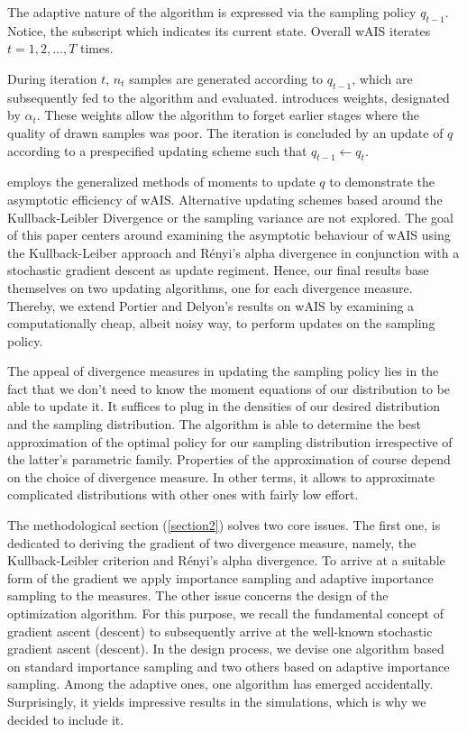 \begin{multicols}{2}
 The adaptive nature of the algorithm is expressed via the sampling policy $q_{t-1}$. Notice, the subscript which indicates its current state. Overall wAIS iterates $t = 1, 2, ...,T$ times. 

During iteration $t$, $n_t$ samples are generated according to $q_{t-1}$, which are subsequently fed to the algorithm and evaluated. \cite{portierdelyonWAIS} introduces weights, designated by $\alpha_t$. These weights allow the algorithm to forget earlier stages where the quality of drawn samples was poor. The iteration is concluded by an update of $q$ according to a prespecified updating scheme such that $q_{t-1} \gets q_t$. 

\bigskip

\cite{portierdelyonWAIS} employs the generalized methods of moments to update $q$ to demonstrate the asymptotic efficiency of wAIS. Alternative updating schemes based around the Kullback-Leibler Divergence or the sampling variance are not explored. The goal of this paper centers around examining the asymptotic behaviour of wAIS using the Kullback-Leiber approach and Rényi's alpha divergence in conjunction with a stochastic gradient descent as update regiment. Hence, our final results base themselves on two updating algorithms, one for each divergence measure.  Thereby, we extend Portier and Delyon's results on wAIS by examining a computationally cheap, albeit noisy way, to perform updates on the sampling policy. 

The appeal of divergence measures in updating the sampling policy lies in the fact that we don't need to know the moment equations of our distribution to be able to update it. It suffices to plug in the densities of our desired distribution and the sampling distribution. The algorithm is able to determine the best approximation of the optimal policy for our sampling distribution irrespective of the latter's parametric family. Properties of the approximation of course depend on the choice of divergence measure. In other terms, it allows to approximate complicated distributions with other ones with fairly low effort.

\bigskip

The methodological section (\ref{section2}) solves two core issues. The first one, is dedicated to deriving the gradient of two divergence measure, namely, the Kullback-Leibler criterion and Rényi's alpha divergence. To arrive at a suitable form of the gradient we apply importance sampling and adaptive importance sampling to the measures. 
The other issue concerns the design of the optimization algorithm. For this purpose, we recall the fundamental concept of gradient ascent (descent) to subsequently arrive at the well-known stochastic gradient ascent (descent). In the design process, we devise one algorithm based on standard importance sampling and two others based on adaptive importance sampling. Among the adaptive ones, one algorithm has emerged accidentally. Surprisingly, it yields impressive results in the simulations, which is why we decided to include it. 


\end{multicols}
